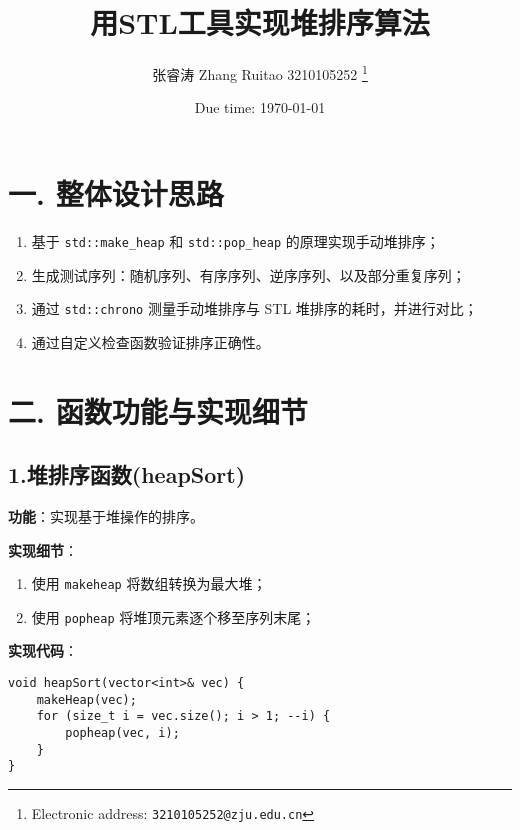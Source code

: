 \documentclass[a4paper]{article}
\begin{document}
\title{用STL工具实现堆排序算法}

\author{张睿涛 Zhang Ruitao 3210105252
  \thanks{Electronic address: \texttt{3210105252@zju.edu.cn}}}

\date{Due time: \today}
\maketitle

\section*{一. 整体设计思路}

\begin{enumerate}
    \item 基于 \texttt{std::make\_heap} 和 \texttt{std::pop\_heap} 的原理实现手动堆排序；
    \item 生成测试序列：随机序列、有序序列、逆序序列、以及部分重复序列；
    \item 通过 \texttt{std::chrono} 测量手动堆排序与 STL 堆排序的耗时，并进行对比；
    \item 通过自定义检查函数验证排序正确性。
\end{enumerate}

\section*{二. 函数功能与实现细节}

\subsection*{1.堆排序函数(heapSort)}
\textbf{功能}：实现基于堆操作的排序。

\textbf{实现细节}：
\begin{enumerate}
    \item 使用 \texttt{makeheap} 将数组转换为最大堆；
    \item 使用 \texttt{popheap} 将堆顶元素逐个移至序列末尾；
\end{enumerate}

\textbf{实现代码}：
\begin{lstlisting}
void heapSort(vector<int>& vec) {
    makeHeap(vec); 
    for (size_t i = vec.size(); i > 1; --i) {
        popheap(vec, i); 
    }
}
\end{lstlisting}
\end{document}
